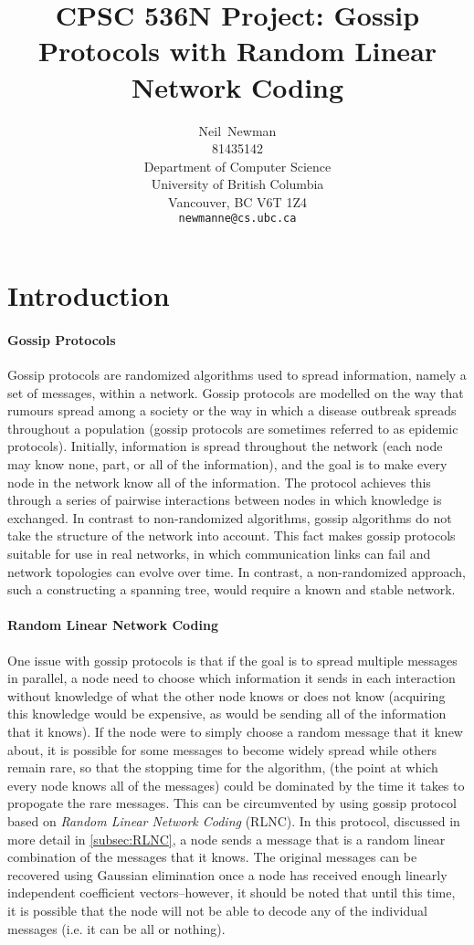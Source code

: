 \documentclass{article} %
\title{CPSC 536N Project: Gossip Protocols with Random Linear Network Coding}
\author{
Neil~Newman\\
81435142\\
Department of Computer Science\\
University of British Columbia\\
Vancouver, BC V6T 1Z4 \\
\texttt{newmanne@cs.ubc.ca}
}
\begin{document}
\maketitle

\section{Introduction}
\paragraph{Gossip Protocols}
Gossip protocols are randomized algorithms used to spread information, namely a set of messages, within a network. Gossip protocols are modelled on the way that rumours spread among a society or the way in which a disease outbreak spreads throughout a population (gossip protocols are sometimes referred to as epidemic protocols). Initially, information is spread throughout the network (each node may know none, part, or all of the information), and the goal is to make every node in the network know all of the information. The protocol achieves this through a series of pairwise interactions between nodes in which knowledge is exchanged. In contrast to non-randomized algorithms, gossip algorithms do not take the structure of the network into account. This fact makes gossip protocols suitable for use in real networks, in which communication links can fail and network topologies can evolve over time. In contrast, a non-randomized approach, such a constructing a spanning tree, would require a known and stable network. 

\paragraph{Random Linear Network Coding}
One issue with gossip protocols is that if the goal is to spread multiple messages in parallel, a node need to choose which information it sends in each interaction without knowledge of what the other node knows or does not know (acquiring this knowledge would be expensive, as would be sending all of the information that it knows). If the node were to simply choose a random message that it knew about, it is possible for some messages to become widely spread while others remain rare, so that the stopping time for the algorithm, (the point at which every node knows all of the messages) could be dominated by the time it takes to propogate the rare messages. This can be circumvented by using gossip protocol based on \emph{Random Linear Network Coding} (RLNC). In this protocol, discussed in more detail in \ref{subsec:RLNC}, a node sends a message that is a random linear combination of the messages that it knows. The original messages can be recovered using Gaussian elimination once a node has received enough linearly independent coefficient vectors--however, it should be noted that until this time, it is possible that the node will not be able to decode any of the individual messages (i.e. it can be all or nothing).
\end{document}
